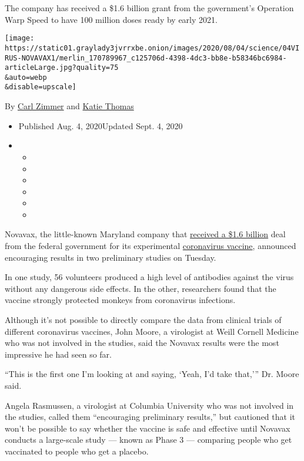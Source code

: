The company has received a \$1.6 billion grant from the government's
Operation Warp Speed to have 100 million doses ready by early 2021.

\texttt{[image: https://static01.graylady3jvrrxbe.onion/images/2020/08/04/science/04VIRUS-NOVAVAX1/merlin\_170789967\_c125706d-4398-4dc3-bb8e-b58346bc6984-articleLarge.jpg?quality=75\\\&auto=webp\\\&disable=upscale]}

By \href{https://www.nytimes3xbfgragh.onion/by/carl-zimmer}{Carl Zimmer}
and \href{https://www.nytimes3xbfgragh.onion/by/katie-thomas}{Katie
Thomas}

\begin{itemize}
\item
  Published Aug. 4, 2020Updated Sept. 4, 2020
\item
  \begin{itemize}
  \item
  \item
  \item
  \item
  \item
  \item
  \end{itemize}
\end{itemize}

Novavax, the little-known Maryland company that
\href{https://www.nytimes3xbfgragh.onion/2020/07/16/health/coronavirus-vaccine-novavax.html}{received
a \$1.6 billion} deal from the federal government for its experimental
\href{https://www.nytimes3xbfgragh.onion/2020/09/04/health/russia-covid-vaccine.html}{coronavirus
vaccine}, announced encouraging results in two preliminary studies on
Tuesday.

In one study, 56 volunteers produced a high level of antibodies against
the virus without any dangerous side effects. In the other, researchers
found that the vaccine strongly protected monkeys from coronavirus
infections.

Although it's not possible to directly compare the data from clinical
trials of different coronavirus vaccines, John Moore, a virologist at
Weill Cornell Medicine who was not involved in the studies, said the
Novavax results were the most impressive he had seen so far.

``This is the first one I'm looking at and saying, `Yeah, I'd take
that,''' Dr. Moore said.

Angela Rasmussen, a virologist at Columbia University who was not
involved in the studies, called them ``encouraging preliminary
results,'' but cautioned that it won't be possible to say whether the
vaccine is safe and effective until Novavax conducts a large-scale study
--- known as Phase 3 --- comparing people who get vaccinated to people
who get a placebo.

